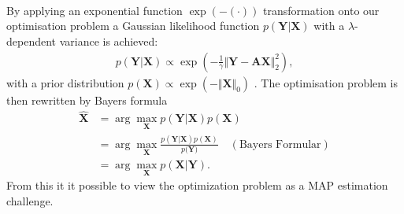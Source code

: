\\
\\ \\
By applying an exponential function $\exp(- (\cdot))$ transformation onto our optimisation problem a Gaussian likelihood function $p(\mathbf{Y} \vert \mathbf{X})$ with a $\lambda$-dependent variance is achieved:
\begin{align*}
p(\mathbf{Y} \vert \mathbf{X}) \propto \exp \left( - \frac{1}{\gamma} \Vert \mathbf{Y} - \mathbf{AX} \Vert_2^2 \right),
\end{align*}
with a prior distribution $p(\mathbf{X}) \propto \exp(- \Vert \mathbf{X} \Vert_0)$ \cite[p. 137]{phd_wipf}. 
The optimisation problem is then rewritten by Bayers formula 
\begin{align*}
\hat{\mathbf{X}} &= \arg \max_{\mathbf{X}} p(\mathbf{Y} \vert \mathbf{X}) p(\mathbf{X}) \\
&= \arg \max_{\mathbf{X}} \frac{p(\mathbf{Y} \vert \mathbf{X}) p(\mathbf{X})}{p(\mathbf{Y)}} \quad (\text{Bayers Formular}) \\
&= \arg \max_{\mathbf{X}} p(\mathbf{X} \vert \mathbf{Y}).
\end{align*}
From this it it possible to view the optimization problem as a MAP estimation challenge.


